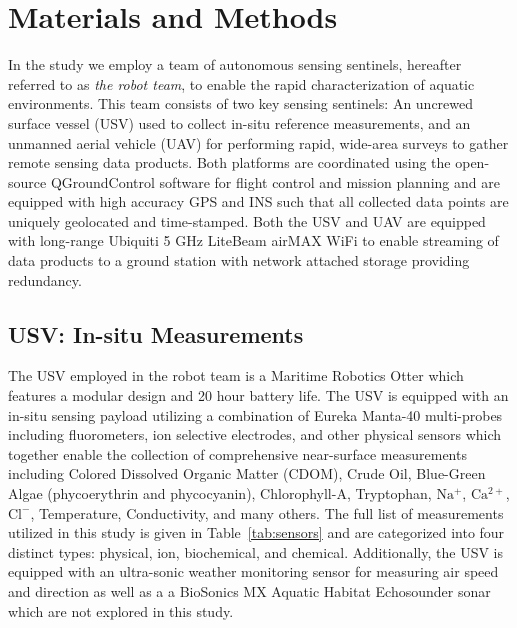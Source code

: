 \documentclass[journal,article,submit,pdftex,moreauthors]{Definitions/mdpi}
\begin{document}
\section{Materials and Methods}

In the study we employ a team of autonomous sensing sentinels, hereafter referred to as \textit{the robot team}, to enable the rapid characterization of aquatic environments. This team consists of two key sensing sentinels: An uncrewed surface vessel (USV) used to collect in-situ reference measurements, and an unmanned aerial vehicle (UAV) for performing rapid, wide-area surveys to gather remote sensing data products. Both platforms are coordinated using the open-source QGroundControl software for flight control and mission planning \cite{qgroundcontrol} and are equipped with high accuracy GPS and INS such that all collected data points are uniquely geolocated and time-stamped. Both the USV and UAV are equipped with long-range Ubiquiti 5 GHz LiteBeam airMAX WiFi to enable streaming of data products to a ground station with network attached storage providing redundancy.

\subsection{USV: In-situ Measurements}

The USV employed in the robot team is a Maritime Robotics Otter which features a modular design and 20 hour battery life. The USV is equipped with an in-situ sensing payload utilizing a combination of Eureka Manta-40 multi-probes including fluorometers, ion selective electrodes, and other physical sensors which together enable the collection of comprehensive near-surface measurements including Colored Dissolved Organic Matter (CDOM), Crude Oil, Blue-Green Algae (phycoerythrin and phycocyanin), Chlorophyll-A, Tryptophan, $\mathrm{Na^+}$, $\mathrm{Ca^{2+}}$, $\mathrm{Cl^-}$, Temperature, Conductivity, and many others. The full list of measurements utilized in this study is given in Table~\ref{tab:sensors} and are categorized into four distinct types: physical, ion, biochemical, and chemical. Additionally, the USV is equipped with an ultra-sonic weather monitoring sensor for measuring air speed and direction as well as a a BioSonics MX Aquatic Habitat Echosounder sonar which are not explored in this study.

\end{document}
